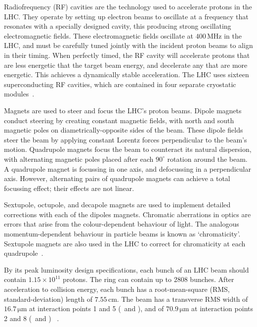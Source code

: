 Radiofrequency (RF) cavities are the technology used to accelerate protons in
the LHC.
They operate by setting up electron beams to oscillate at a frequency that
resonates with a specially designed cavity, this producing strong oscillating
electromagnetic fields.
These electromagnetic fields oscillate at $400\,\mathrm{MHz}$ in the LHC, and
must be carefully tuned jointly with the incident proton beams to align in
their timing.
When perfectly timed, the RF cavity will accelerate protons that are less
energetic that the target beam energy, and decelerate any that are more
energetic.
This achieves a dynamically stable acceleration.
The LHC uses sixteen superconducting RF cavities, which are contained in four
separate cryostatic modules~\cite{lhcDesignreport2004}.

Magnets are used to steer and focus the LHC's proton beams.
Dipole magnets conduct steering by creating constant magnetic fields, with
north and south magnetic poles on diametrically-opposite sides of the beam.
These dipole fields steer the beam by applying constant Lorentz forces
perpendicular to the beam's motion.
Quadrupole magnets focus the beam to counteract its natural dispersion, with
alternating magnetic poles placed after each $90^\circ$ rotation around the
beam.
A quadrupole magnet is focussing in one axis, and defocussing in a
perpendicular axis.
However, alternating pairs of quadrupole magnets can achieve
a total focussing effect; their effects are not linear.

Sextupole, octupole, and decapole magnets are used to implement detailed
corrections with each of the dipoles magnets.
Chromatic aberrations in optics are errors that arise from the colour-dependent
behaviour of light.
The analogous momentum-dependent behaviour in particle beams is known as
`chromaticity'.
Sextupole magnets are also used in the LHC to correct for chromaticity at each
quadrupole~\cite{Guiducci:1992kb, lhc2008machine}.

By its peak luminosity design specifications, each bunch of an LHC beam
should contain $1.15\times10^{11}$ protons.
The ring can contain up to $2808$ bunches.
After acceleration to collision energy, each bunch has a root-mean-square
(RMS, standard-deviation) length of $7.55\,\mathrm{cm}$.
The beam has a transverse RMS width of $16.7\,\mathrm{\mu m}$ at
interaction points 1 and 5 (\atlas\ and \cms),
and of $70.9\,\mathrm{\mu m}$ at
interaction points 2 and 8 (\alice\ and \lhcb)%
~\cite{lhcDesignreport2004}.

